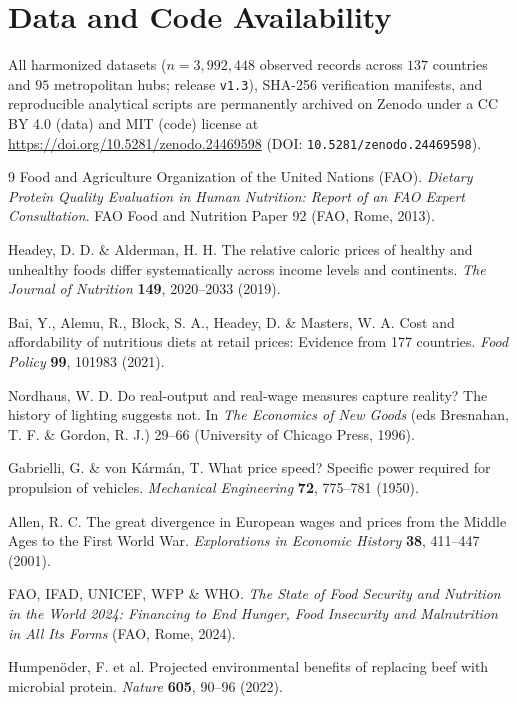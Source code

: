 \documentclass[11pt,a4paper]{article}
\begin{document}
\section*{Data and Code Availability}
All harmonized datasets ($n = 3{,}992{,}448$ observed records across $137$ countries and $95$ metropolitan hubs; release \texttt{v1.3}), SHA-256 verification manifests, and reproducible analytical scripts are permanently archived on Zenodo under a CC BY 4.0 (data) and MIT (code) license at \url{https://doi.org/10.5281/zenodo.24469598} (DOI: \texttt{10.5281/zenodo.24469598}).

\begin{thebibliography}{9}
Food and Agriculture Organization of the United Nations (FAO). \textit{Dietary Protein Quality Evaluation in Human Nutrition: Report of an FAO Expert Consultation}. FAO Food and Nutrition Paper 92 (FAO, Rome, 2013).

Headey, D. D. \& Alderman, H. H. The relative caloric prices of healthy and unhealthy foods differ systematically across income levels and continents. \textit{The Journal of Nutrition} \textbf{149}, 2020--2033 (2019).

Bai, Y., Alemu, R., Block, S. A., Headey, D. \& Masters, W. A. Cost and affordability of nutritious diets at retail prices: Evidence from 177 countries. \textit{Food Policy} \textbf{99}, 101983 (2021).

Nordhaus, W. D. Do real-output and real-wage measures capture reality? The history of lighting suggests not. In \textit{The Economics of New Goods} (eds Bresnahan, T. F. \& Gordon, R. J.) 29--66 (University of Chicago Press, 1996).

Gabrielli, G. \& von K\'arm\'an, T. What price speed? Specific power required for propulsion of vehicles. \textit{Mechanical Engineering} \textbf{72}, 775--781 (1950).

Allen, R. C. The great divergence in European wages and prices from the Middle Ages to the First World War. \textit{Explorations in Economic History} \textbf{38}, 411--447 (2001).

FAO, IFAD, UNICEF, WFP \& WHO. \textit{The State of Food Security and Nutrition in the World 2024: Financing to End Hunger, Food Insecurity and Malnutrition in All Its Forms} (FAO, Rome, 2024).

Humpen\"oder, F. et al. Projected environmental benefits of replacing beef with microbial protein. \textit{Nature} \textbf{605}, 90--96 (2022).
\end{thebibliography}
\end{document}
